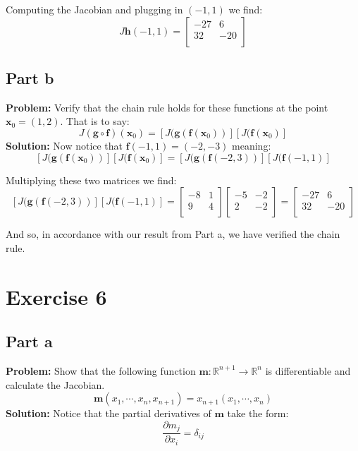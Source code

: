 \documentclass{article}
\begin{document}
Computing the Jacobian and plugging in $(-1,1)$ we find:
$$J\mathbf h(-1,1)=\begin{bmatrix}
    -27 & 6 \\
    32 & -20 \\
\end{bmatrix}$$

\subsection*{Part b}
\textbf{Problem:} Verify that the chain rule holds for these functions at the point $\mathbf x_0=(1,2)$. That is to say:
$$J(\mathbf g\circ\mathbf f)(\mathbf x_0)=[J(\mathbf g(\mathbf f(\mathbf x_0))][J(\mathbf f(\mathbf x_0)]$$
\textbf{Solution:} Now notice that $\mathbf f(-1,1)=(-2,-3)$ meaning:
$$[J(\mathbf g(\mathbf f(\mathbf x_0))][J(\mathbf f(\mathbf x_0)]=[J(\mathbf g(\mathbf f(-2,3))][J(\mathbf f(-1,1)]$$

Multiplying these two matrices we find:
$$[J(\mathbf g(\mathbf f(-2,3))][J(\mathbf f(-1,1)]=\begin{bmatrix}
    -8 & 1 \\
    9 & 4 \\
\end{bmatrix}
\begin{bmatrix}
    -5 & -2 \\
    2 & -2 \\
\end{bmatrix}=
\begin{bmatrix}
    -27 & 6 \\
    32 & -20 \\
\end{bmatrix}$$

And so, in accordance with our result from Part a, we have verified the chain rule.

\section*{Exercise 6}
\subsection*{Part a}
\textbf{Problem:} Show that the following function $\mathbf m:\mathbb R^{n+1}\to\mathbb R^n$ is differentiable and calculate the Jacobian.
$$\mathbf m(x_1,\cdots,x_n,x_{n+1})=x_{n+1}(x_1,\cdots,x_n)$$
\textbf{Solution:} Notice that the partial derivatives of $\mathbf m$ take the form:
$$\frac{\partial m_j}{\partial x_i}=\delta_{ij}$$
\end{document}
